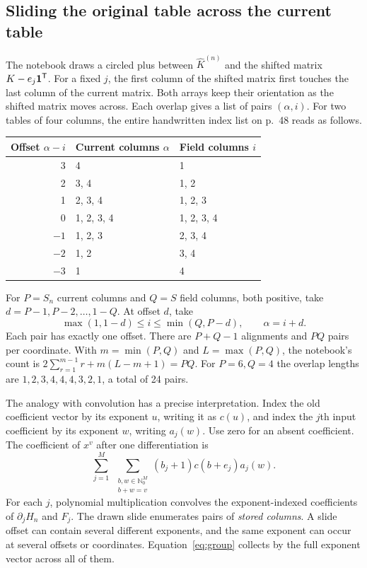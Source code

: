 \documentclass[11pt,letterpaper]{article}
\newcommand{\NN}{\mathbb{N}_0}
\begin{document}
\subsection{Sliding the original table across the current table}\label{sec:slide}
The notebook draws a circled plus between \(\widehat K^{(n)}\) and the shifted
matrix \(K-e_j{\bf1}^{\mathsf T}\). For a fixed \(j\), the first column of the
shifted matrix first touches the last column of the current matrix.
Both arrays keep their orientation as the shifted matrix moves across. Each
overlap gives a list of pairs \((\alpha,i)\). For two tables of four columns,
the entire handwritten index list on p.~48 reads as follows.
\begin{center}
\begin{tabular}{@{}rll@{}}
\toprule
Offset \(\alpha-i\)& Current columns \(\alpha\)& Field columns \(i\)\\
\midrule
 3&4&1\\
 2&3, 4&1, 2\\
 1&2, 3, 4&1, 2, 3\\
 0&1, 2, 3, 4&1, 2, 3, 4\\
 \(-1\)&1, 2, 3&2, 3, 4\\
 \(-2\)&1, 2&3, 4\\
 \(-3\)&1&4\\
\bottomrule
\end{tabular}
\end{center}
For \(P=S_n\) current columns and \(Q=S\) field columns, both positive, take
\(d=P-1,P-2,\ldots,1-Q\). At offset \(d\), take
\[
 \max(1,1-d)\le i\le\min(Q,P-d),\qquad \alpha=i+d.
\]
Each pair has exactly one offset. There are \(P+Q-1\) alignments and \(PQ\)
pairs per coordinate. With \(m=\min(P,Q)\) and \(L=\max(P,Q)\), the notebook's
count is \(2\sum_{r=1}^{m-1}r+m(L-m+1)=PQ\). For \(P=6,Q=4\) the overlap
lengths are \(1,2,3,4,4,4,3,2,1\), a total of 24 pairs.

The analogy with convolution has a precise interpretation. Index the old
coefficient vector by its exponent \(u\), writing it as \(c(u)\), and index
the \(j\)th input coefficient by its exponent \(w\), writing \(a_j(w)\).
Use zero for an absent coefficient. The coefficient of \(x^v\) after one
differentiation is
\begin{equation}\label{eq:conv}
 \sum_{j=1}^M\;\sum_{\substack{b,w\in\NN^M\\b+w=v}}
       (b_j+1)c(b+e_j)a_j(w).
\end{equation}
For each \(j\), polynomial multiplication convolves the exponent-indexed
coefficients of \(\partial_j H_n\) and \(F_j\). The drawn slide enumerates
pairs of \emph{stored columns}. A slide offset can contain several different
exponents, and the same exponent can occur at several offsets or coordinates.
Equation~\eqref{eq:group} collects by the full exponent vector across all of them.
\end{document}
